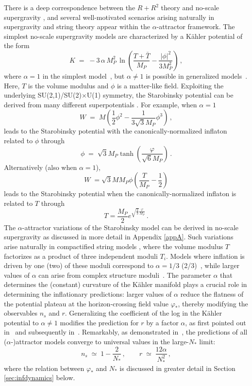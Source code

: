 \documentclass[aps,prev,twocolumn,preprintnumbers,floatfix,nofootinbib]{revtex4-1}
\newcommand{\beq}{\begin{equation}}
\newcommand{\eeq}{\end{equation}}
\begin{document}
There is a deep correspondence between the $R+R^2$ theory and no-scale supergravity \cite{ENO6,ENO7,DLT,DGKLP,eno9,building,Ema:2024sit}, and several well-motivated scenarios arising naturally in supergravity and string theory appear within the $\alpha$-attractor framework. The simplest no-scale supergravity \cite{no-scale,LN} models are characterized by a K\"ahler potential of the form 
\beq
K \; = \; -3 \, \alpha \, M_P^2 \, \ln\left(\frac{T + \bar{T}}{M_P} - \frac{|\phi|^2}{3M_P^2}\right) \, ,
\label{n-sK}
\eeq
where $\alpha = 1$ in the simplest model~\cite{ENO6}, but $\alpha \ne 1$ is possible in generalized models~\cite{ENO7}. Here, $T$ is the volume modulus and $\phi$ is a matter-like field. Exploiting the underlying SU(2,1)/SU(2)$\times$U(1) symmetry, the Starobinsky potential can be derived from many different superpotentials \cite{ENO6,ENO7,enov1}. For example, when $\alpha = 1$
\beq
W \; = \; M \left(\frac12 \phi^2 - \frac{1}{3\sqrt{3} M_P}\phi^3 \right) \, ,
\label{wz}
\eeq
leads to the Starobinsky potential \cite{ENO6} with the canonically-normalized inflaton related to $\phi$ through
\beq
\label{phi}
\phi \; = \; \sqrt{3} M_P \tanh \left(\frac{\varphi}{\sqrt{6}M_P} \right) \, .
\eeq
Alternatively (also when $\alpha = 1$), 
\begin{equation}
W \; = \sqrt{3} M M_P \phi \left(\frac{T}{M_P} - \frac{1}{2}\right)
\label{W3}
\end{equation}
leads to the Starobinsky potential \cite{Cecotti,ENO7} when the canonically-normalized inflaton is related to $T$ through
\beq
T = \frac{M_P}{2} e^{\sqrt{\frac23}\frac{\varphi}{M_P}}
\label{canT}
\, .
\eeq
The $\alpha$-attractor variations of the Starobinsky model can be derived in no-scale supergravity as discussed in more detail in Appendix \ref{appA}. Such variations arise naturally in compactified string models \cite{Witten}, where the volume modulus $T$ factorizes as a product of three independent moduli $T_i$. Models where inflation is driven by one (two) of these moduli correspond to $\alpha = 1/3$ (2/3)~\cite{ENO7}, while larger values of $\alpha$ can arise from complex structure moduli~\cite{Kallosh:2013hoa}.
The parameter $\alpha$ that determines the (constant) curvature of the K\"ahler manifold plays a crucial role in determining the inflationary predictions: larger values of $\alpha$ reduce the flatness of the potential plateau at the horizon-crossing field value $\varphi_*$, thereby modifying the observables $n_s$ and $r$. 
Generalizing the coefficient of the log in the K\"ahler potential to $\alpha \ne 1$ modifies the prediction for $r$ by a factor $\alpha$, as first pointed out in~\cite{ENO7} and subsequently in~\cite{KLR}.
Remarkably, as demonstrated in~\cite{ENO7,KLR,T-model,rs,ENOV3,building}, the predictions of all ($\alpha$-)attractor models converge to universal values in the large-$N_*$ limit:
\begin{equation}
\label{eq:cmbpredictions}
n_s \; \simeq \; 1 - \frac{2}{N_*}\,, \qquad r \; \simeq\; \frac{12\alpha}{N_*^2}\,,
\end{equation}
where the relation between $\varphi_*$ and $N_*$ is discussed in greater detail in Section \ref{sec:infdynamics} below.
\end{document}

